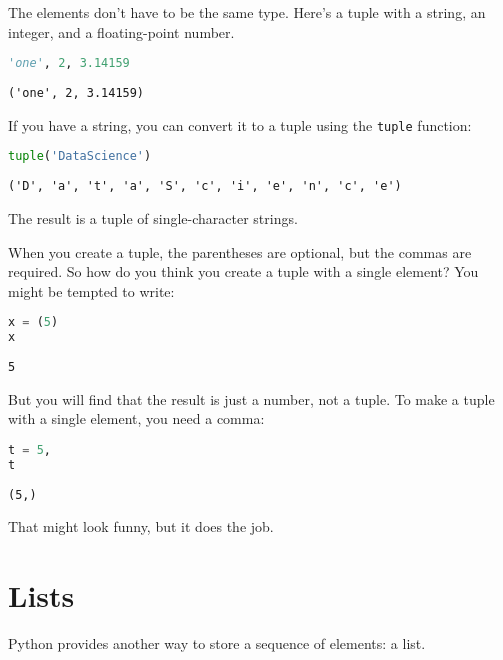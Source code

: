 The elements don't have to be the same type. Here's a tuple with a
string, an integer, and a floating-point number.

\begin{lstlisting}[language=Python]
'one', 2, 3.14159 
\end{lstlisting}

\begin{lstlisting}[]
('one', 2, 3.14159)
\end{lstlisting}

If you have a string, you can convert it to a tuple using the
\passthrough{\lstinline!tuple!} function:

\begin{lstlisting}[language=Python]
tuple('DataScience')
\end{lstlisting}

\begin{lstlisting}[]
('D', 'a', 't', 'a', 'S', 'c', 'i', 'e', 'n', 'c', 'e')
\end{lstlisting}

The result is a tuple of single-character strings.

When you create a tuple, the parentheses are optional, but the commas
are required. So how do you think you create a tuple with a single
element? You might be tempted to write:

\begin{lstlisting}[language=Python]
x = (5)
x
\end{lstlisting}

\begin{lstlisting}[]
5
\end{lstlisting}

But you will find that the result is just a number, not a tuple. To make
a tuple with a single element, you need a comma:

\begin{lstlisting}[language=Python]
t = 5,
t
\end{lstlisting}

\begin{lstlisting}[]
(5,)
\end{lstlisting}

That might look funny, but it does the job.

\hypertarget{lists}{%
\section{Lists}\label{lists}}

Python provides another way to store a sequence of elements: a list.

